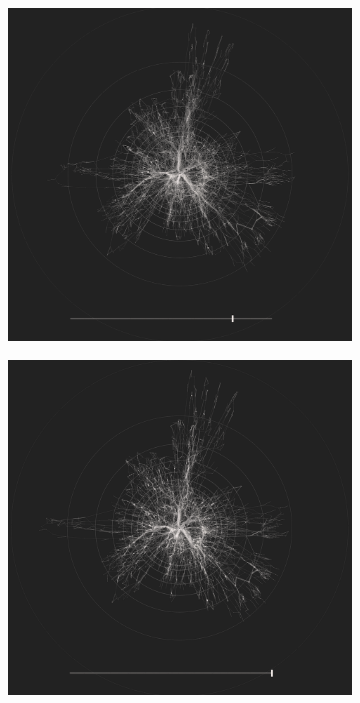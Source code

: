 \begin{figure}[H]
\begin{subfigure}[b]{.49\textwidth}
    \end{subfigure}
    \centering
     \begin{subfigure}[b]{.49\textwidth}
        \centering
    \includegraphics[width=\textwidth]{figures_c1/layout/confluent/75.png}
    \caption{}
    \end{subfigure}
    \centering
     \begin{subfigure}[b]{.49\textwidth}
        \centering
    \includegraphics[width=\textwidth]{figures_c1/layout/confluent/100.png}

\end{subfigure}
\end{figure}
